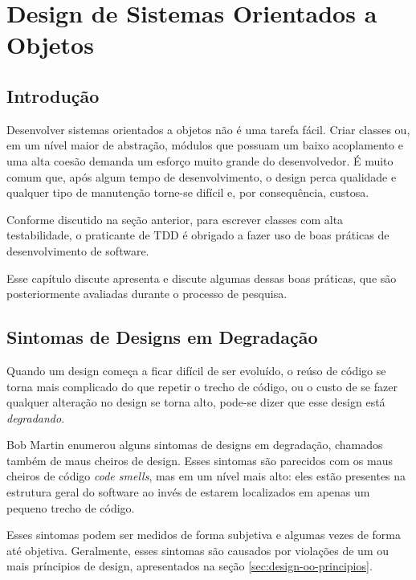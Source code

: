 \chapter{Design de Sistemas Orientados a Objetos}
\label{cap:design}

\section{Introdução}
\label{sec:design-introducao}

Desenvolver sistemas orientados a objetos não é uma tarefa fácil. Criar
classes ou, em um nível maior de abstração, módulos que possuam um baixo
acoplamento e uma alta coesão demanda um esforço muito grande do desenvolvedor. 
É muito comum que, após algum tempo de desenvolvimento, o design perca qualidade
e qualquer tipo de manutenção torne-se difícil e, por consequência, custosa.

Conforme discutido na seção anterior, para escrever classes com alta
testabilidade, o praticante de TDD é obrigado a fazer uso de boas práticas de
desenvolvimento de software. 

Esse capítulo discute apresenta e discute algumas dessas boas práticas, que
são posteriormente avaliadas durante o processo de pesquisa.

\section{Sintomas de Designs em Degradação}
\label{sec:design-degradacao}

Quando um design começa a ficar difícil de ser evoluído, o reúso de código se 
torna mais complicado do que repetir o trecho de código, ou o custo de se fazer 
qualquer alteração no design se torna alto, pode-se dizer que esse design
está \textit{degradando}. 

Bob Martin \cite{bob-martin} enumerou alguns sintomas de designs em degradação, 
chamados também de maus cheiros de design. Esses sintomas são parecidos com os 
maus cheiros de código \textit{code smells}, mas em um nível mais alto: eles
estão presentes na estrutura geral do software ao invés de estarem localizados
em apenas um pequeno trecho de código.

Esses sintomas podem ser medidos de forma subjetiva e algumas vezes de forma 
até objetiva. Geralmente, esses sintomas são causados por violações de um ou 
mais príncipios de design, apresentados na seção \ref{sec:design-oo-principios}.

